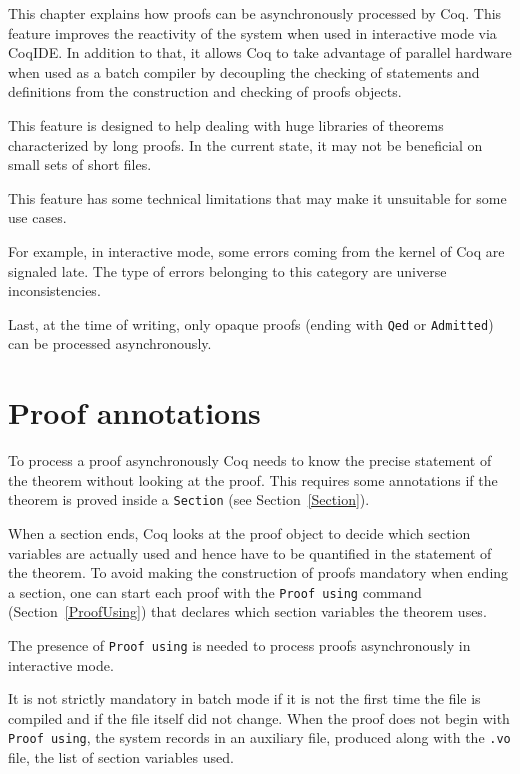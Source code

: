 
\label{pralitp}

This chapter explains how proofs can be asynchronously processed by Coq.
This feature improves the reactivity of the system when used in interactive
mode via CoqIDE.  In addition to that, it allows Coq to take advantage of
parallel hardware when used as a batch compiler by decoupling the checking
of statements and definitions from the construction and checking of proofs
objects.

This feature is designed to help dealing with huge libraries of theorems
characterized by long proofs. In the current state, it may not be beneficial
on small sets of short files.

This feature has some technical limitations that may make it unsuitable for
some use cases.

For example, in interactive mode, some errors coming from the kernel of Coq
are signaled late.  The type of errors belonging to this category
are universe inconsistencies.

Last, at the time of writing, only opaque proofs (ending with \texttt{Qed} or \texttt{Admitted}) can be processed asynchronously.

\section{Proof annotations}

To process a proof asynchronously Coq needs to know the precise statement
of the theorem without looking at the proof.  This requires some annotations
if the theorem is proved inside a \texttt{Section} (see Section~\ref{Section}).

When a section ends, Coq looks at the proof object to decide which
section variables are actually used and hence have to be quantified in the
statement of the theorem.  To avoid making the construction of proofs
mandatory when ending a section, one can start each proof with the
\texttt{Proof using} command (Section~\ref{ProofUsing}) that declares which
section variables the theorem uses.

The presence of \texttt{Proof using} is needed to process proofs
asynchronously in interactive mode.

It is not strictly mandatory in batch mode if it is not the first time
the file is compiled and if the file itself did not change. When the
proof does not begin with \texttt{Proof using}, the system records in an
auxiliary file, produced along with the \texttt{.vo} file, the list of
section variables used.

